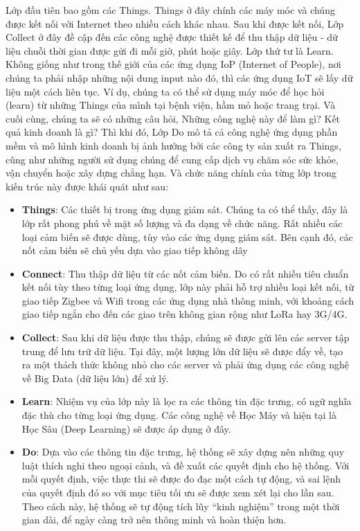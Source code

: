 Lớp đầu tiên bao gồm các Things. Things ở đây chính các máy móc và chúng được kết nối với Internet theo nhiều cách khác nhau. Sau khi được kết nối, Lớp Collect ở đây đề cập đến các công nghệ được thiết kế để thu thập dữ liệu - dữ liệu chuỗi thời gian được gửi đi mỗi giờ, phút hoặc giây. Lớp thứ tư là Learn. Không giống như trong thế giới của các ứng dụng IoP (Internet of People), nơi chúng ta phải nhập những nội dung input nào đó, thì các ứng dụng IoT sẽ lấy dữ liệu một cách liên tục. Ví dụ, chúng ta có thể sử dụng máy móc để học hỏi (learn) từ những Things của mình tại bệnh viện, hầm mỏ hoặc trang trại. Và cuối cùng, chúng ta sẽ có những câu hỏi, Những công nghệ này để làm gì? Kết quả kinh doanh là gì? Thì khi đó, Lớp Do mô tả cả công nghệ ứng dụng phần mềm và mô hình kinh doanh bị ảnh hưởng bởi các công ty sản xuất ra Things, cũng như những người sử dụng chúng để cung cấp dịch vụ chăm sóc sức khỏe, vận chuyển hoặc xây dựng chẳng hạn. Và chức năng chính của từng lớp trong kiến trúc này được khái quát như sau:
\begin{itemize}
    \item \textbf{Things}: Các thiết bị trong ứng dụng giám sát. Chúng ta có thể thấy, đây là lớp rất phong phú về mặt số lượng và đa dạng về chức năng. Rất nhiều các loại cảm biến sẽ được dùng, tùy vào các ứng dụng giám sát. Bên cạnh đó, các nốt cảm biến sẽ chủ yếu dựa vào giao tiếp không dây
    \item \textbf{Connect}: Thu thập dữ liệu từ các nốt cảm biến. Do có rất nhiều tiêu chuẩn kết nối tùy theo từng loại ứng dụng, lớp này phải hỗ trợ nhiều loại kết nối, từ giao tiếp Zigbee và Wifi trong các ứng dụng nhà thông minh, với khoảng cách giao tiếp ngắn cho đến các giao trên không gian rộng như LoRa hay 3G/4G.
    \item \textbf{Collect}: Sau khi dữ liệu được thu thập, chúng sẽ được gửi lên các server tập trung để lưu trữ dữ liệu. Tại đây, một lượng lớn dữ liệu sẽ được đẩy về, tạo ra một thách thức không nhỏ cho các server và phải ứng dụng các công nghệ về Big Data (dữ liệu lớn) để xử lý.
    \item \textbf{Learn}: Nhiệm vụ của lớp này là lọc ra các thông tin đặc trưng, có ngữ nghĩa đặc thù cho từng loại ứng dụng. Các công nghệ về Học Máy và hiện tại là Học Sâu (Deep Learning) sẽ được áp dụng ở đây.
    \item \textbf{Do}: Dựa vào các thông tin đặc trưng, hệ thống sẽ xây dựng nên những quy luật thích nghi theo ngoại cảnh, và đề xuất các quyết định cho hệ thống. Với mỗi quyết định, việc thực thi sẽ được đo đạc một cách tự động, và sai lệnh của quyết định đó so với mục tiêu tối ưu sẽ được xem xét lại cho lần sau. Theo cách này, hệ thống sẽ tự động tích lũy “kinh nghiệm” trong một thời gian dài, để ngày càng trở nên thông minh và hoàn thiện hơn.
    
\end{itemize}

